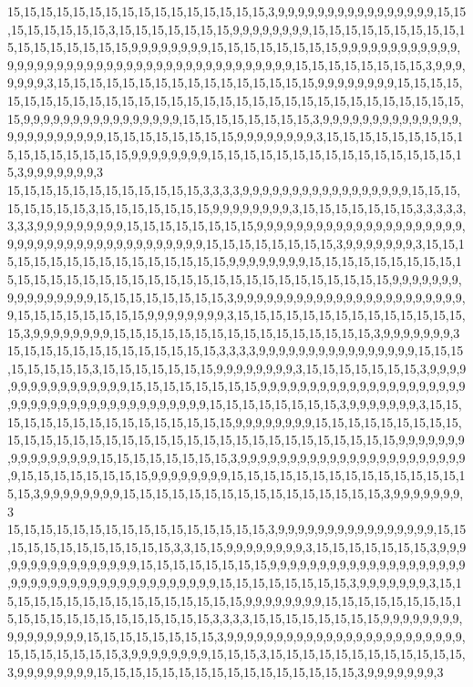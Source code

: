 15,15,15,15,15,15,15,15,15,15,15,15,15,15,15,15,3,9,9,9,9,9,9,9,9,9,9,9,9,9,9,9,9,15,15,15,15,15,15,15,15,3,15,15,15,15,15,15,15,9,9,9,9,9,9,9,9,15,15,15,15,15,15,15,15,15,15,15,15,15,15,15,15,15,9,9,9,9,9,9,9,9,15,15,15,15,15,15,15,15,9,9,9,9,9,9,9,9,9,9,9,9,9,9,9,9,9,9,9,9,9,9,9,9,9,9,9,9,9,9,9,9,9,9,9,9,9,9,9,9,9,15,15,15,15,15,15,15,15,3,9,9,9,9,9,9,9,3,15,15,15,15,15,15,15,15,15,15,15,15,15,15,15,15,9,9,9,9,9,9,9,9,15,15,15,15,15,15,15,15,15,15,15,15,15,15,15,15,15,15,15,15,15,15,15,15,15,15,15,15,15,15,15,15,15,9,9,9,9,9,9,9,9,9,9,9,9,9,9,9,9,15,15,15,15,15,15,15,15,3,9,9,9,9,9,9,9,9,9,9,9,9,9,9,9,9,9,9,9,9,9,9,9,9,15,15,15,15,15,15,15,15,9,9,9,9,9,9,9,9,3,15,15,15,15,15,15,15,15,15,15,15,15,15,15,15,15,9,9,9,9,9,9,9,9,15,15,15,15,15,15,15,15,15,15,15,15,15,15,15,15,3,9,9,9,9,9,9,9,3
15,15,15,15,15,15,15,15,15,15,15,15,3,3,3,3,9,9,9,9,9,9,9,9,9,9,9,9,9,9,9,9,9,15,15,15,15,15,15,15,15,3,15,15,15,15,15,15,15,9,9,9,9,9,9,9,9,3,15,15,15,15,15,15,15,3,3,3,3,3,3,3,3,9,9,9,9,9,9,9,9,9,15,15,15,15,15,15,15,15,9,9,9,9,9,9,9,9,9,9,9,9,9,9,9,9,9,9,9,9,9,9,9,9,9,9,9,9,9,9,9,9,9,9,9,9,9,9,9,9,9,15,15,15,15,15,15,15,15,3,9,9,9,9,9,9,9,3,15,15,15,15,15,15,15,15,15,15,15,15,15,15,15,15,9,9,9,9,9,9,9,9,15,15,15,15,15,15,15,15,15,15,15,15,15,15,15,15,15,15,15,15,15,15,15,15,15,15,15,15,15,15,15,15,15,9,9,9,9,9,9,9,9,9,9,9,9,9,9,9,9,15,15,15,15,15,15,15,15,3,9,9,9,9,9,9,9,9,9,9,9,9,9,9,9,9,9,9,9,9,9,9,9,9,15,15,15,15,15,15,15,15,9,9,9,9,9,9,9,9,3,15,15,15,15,15,15,15,15,15,15,15,15,15,15,15,3,9,9,9,9,9,9,9,9,15,15,15,15,15,15,15,15,15,15,15,15,15,15,15,15,3,9,9,9,9,9,9,9,3
15,15,15,15,15,15,15,15,15,15,15,15,15,3,3,3,3,9,9,9,9,9,9,9,9,9,9,9,9,9,9,9,9,15,15,15,15,15,15,15,15,3,15,15,15,15,15,15,15,9,9,9,9,9,9,9,9,3,15,15,15,15,15,15,15,3,9,9,9,9,9,9,9,9,9,9,9,9,9,9,9,9,15,15,15,15,15,15,15,15,9,9,9,9,9,9,9,9,9,9,9,9,9,9,9,9,9,9,9,9,9,9,9,9,9,9,9,9,9,9,9,9,9,9,9,9,9,9,9,9,9,15,15,15,15,15,15,15,15,3,9,9,9,9,9,9,9,3,15,15,15,15,15,15,15,15,15,15,15,15,15,15,15,15,9,9,9,9,9,9,9,9,15,15,15,15,15,15,15,15,15,15,15,15,15,15,15,15,15,15,15,15,15,15,15,15,15,15,15,15,15,15,15,15,15,9,9,9,9,9,9,9,9,9,9,9,9,9,9,9,9,15,15,15,15,15,15,15,15,3,9,9,9,9,9,9,9,9,9,9,9,9,9,9,9,9,9,9,9,9,9,9,9,9,15,15,15,15,15,15,15,15,9,9,9,9,9,9,9,9,15,15,15,15,15,15,15,15,15,15,15,15,15,15,15,15,3,9,9,9,9,9,9,9,9,15,15,15,15,15,15,15,15,15,15,15,15,15,15,15,15,3,9,9,9,9,9,9,9,3
15,15,15,15,15,15,15,15,15,15,15,15,15,15,15,15,3,9,9,9,9,9,9,9,9,9,9,9,9,9,9,9,9,15,15,15,15,15,15,15,15,15,15,15,15,3,3,15,15,9,9,9,9,9,9,9,9,3,15,15,15,15,15,15,15,3,9,9,9,9,9,9,9,9,9,9,9,9,9,9,9,9,15,15,15,15,15,15,15,15,9,9,9,9,9,9,9,9,9,9,9,9,9,9,9,9,9,9,9,9,9,9,9,9,9,9,9,9,9,9,9,9,9,9,9,9,9,9,9,9,9,15,15,15,15,15,15,15,15,3,9,9,9,9,9,9,9,3,15,15,15,15,15,15,15,15,15,15,15,15,15,15,15,15,9,9,9,9,9,9,9,9,15,15,15,15,15,15,15,15,15,15,15,15,15,15,15,15,15,15,15,15,15,3,3,3,3,15,15,15,15,15,15,15,15,9,9,9,9,9,9,9,9,9,9,9,9,9,9,9,9,15,15,15,15,15,15,15,15,3,9,9,9,9,9,9,9,9,9,9,9,9,9,9,9,9,9,9,9,9,9,9,9,9,15,15,15,15,15,15,15,3,9,9,9,9,9,9,9,9,15,15,15,3,15,15,15,15,15,15,15,15,15,15,15,15,3,9,9,9,9,9,9,9,9,15,15,15,15,15,15,15,15,15,15,15,15,15,15,15,15,3,9,9,9,9,9,9,9,3
